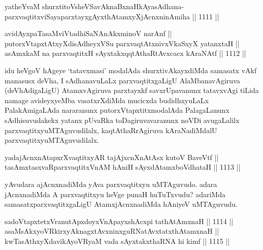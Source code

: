 
\begin{shl}
yatheYvaM shurxtitoV\s sheVSavAknaBxnaHkAyasAdhana-\\
parxvaqtitxviSayaparxtayxgAyxthAtamxyXjAcnxninAmiha \hfill || 1111 ||  
\end{shl}
				
\begin{shl}
avidAyxpaTasaMviVtadhiSaNAnAkxminoV narAnf ||  \\
putorxVtapxtAtxyXdisAdheyxVSu parxvaqtAtxnivxVkaSxyX yatanxtaH || \\
asAmxkaM na parxvaqtitxH sAyxtakxqqtAthaRtAvxcacx kAraNAtf \hfill || 1112 ||  
\end{shl}

\begin{artha}
idu heVgoV hAgeye `tatavxmasi' modalAda shurxtivAkayxdiMda samasatx vAkf manasusx deVha, I sAdhanavuLaLx parxvaqtitxgaLigU  AlaMbanavAgiruva (deVhAdigaLigU) AtamxvAgiruva parxtayxkf savxrUpavanunx tatavxvAgi tiLida namage avideyxyeMba vasatxrXdiMda mucicxda budidhxyuLaLx PalakAmigaLAda nararanunx putorxVtapxtitxmodalAda PalagaLanunx sAdhisuvudakekx yatanx pUvaRka toDagiruvavaranunx noVDi avugaLalilx parxvaqtitxyuMTAguvudilalx, kaqtAthaRrAgiruva kAraNadiMdalU parxvaqtitxyuMTAguvudilalx.
\end{artha}

\begin{shl}
yadajAcnxnAtapxrXvaqtitxyAR tajAjxcnXnAtAsx kutoV BaveVtf || \\
tasAmxtasxvaRparxvaqtitxVnAM hAniH sAyxdAtamxboVdhataH \hfill || 1113 ||  
\end{shl}

\begin{artha}
yAvudara ajAcnxnadiMda yAva parxvaqtitxyu uMTAguvudo. adara jAcnxnadiMda A parxvaqtitxyu heVge punaH huTuTxvudu? adariMda samasatxparxvaqtitxgaLigU AtamxjAcnxnadiMda hAniyeV uMTAguvudu.
\end{artha}

\begin{shl}
sadoVtapxtetxVranutApxdoyxV\s nApayxshAcxpi tathA\s \s tAmxnaH \hfill || 1114 ||  \\
asaMsAkxyoVR\s kirxyAknagxtAvxninxguRNatAvxtatxthA\s \s tamxnaH || \\
kwTasAthxyXdavikAyoVR\s yaM vada sAyxtakxthaRNA hi kimf \hfill || 1115 ||  
\end{shl}

